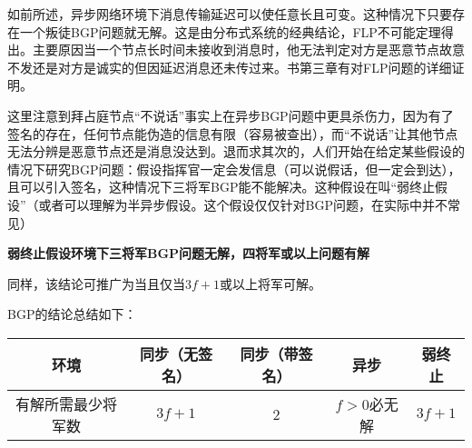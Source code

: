 如前所述，异步网络环境下消息传输延迟可以使任意长且可变。这种情况下只要存在一个叛徒BGP问题就无解。这是由分布式系统的经典结论，FLP不可能定理得出\cite{fischer1982impossibility}。主要原因当一个节点长时间未接收到消息时，他无法判定对方是恶意节点故意不发还是对方是诚实的但因延迟消息还未传过来。书\cite{wattenhofer2016science}第三章有对FLP问题的详细证明。	

这里注意到拜占庭节点“不说话”事实上在异步BGP问题中更具杀伤力，因为有了签名的存在，任何节点能伪造的信息有限（容易被查出），而“不说话”让其他节点无法分辨是恶意节点还是消息没达到。退而求其次的，人们开始在给定某些假设的情况下研究BGP问题：假设指挥官一定会发信息（可以说假话，但一定会到达），且可以引入签名，这种情况下三将军BGP能不能解决。这种假设在\cite{zhihuBFT}叫“弱终止假设”（或者可以理解为半异步假设。这个假设仅仅针对BGP问题，在实际中并不常见）

\textbf{弱终止假设环境下三将军BGP问题无解，四将军或以上问题有解}

同样，该结论可推广为当且仅当$3f+1$或以上将军可解。

BGP的结论总结如下：

\begin{tabular}{|c|c|c|c|c|}
环境	& 同步（无签名）& 同步（带签名）& 异步  & 弱终止 \\\hline
有解所需最少将军数 &  $3f+1$ &   2   &   $f>0$必无解  &    $3f+1$ \\    
\end{tabular}